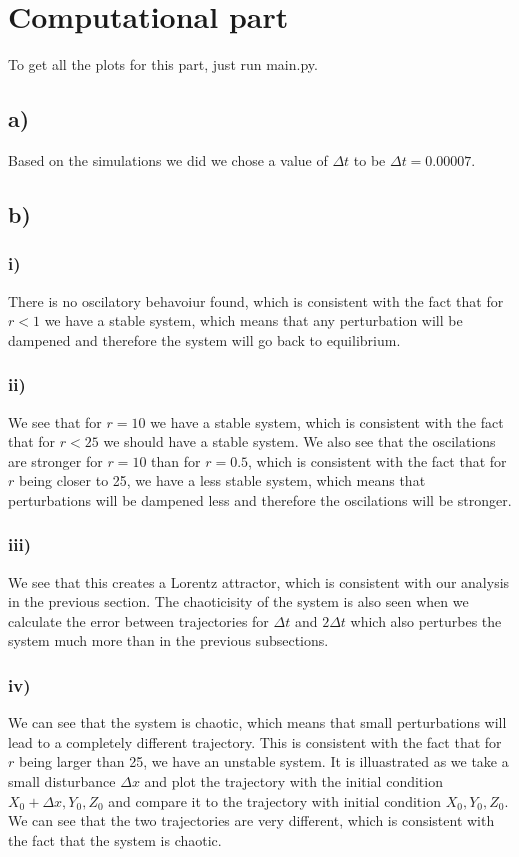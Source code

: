 \documentclass{article}
\begin{document}
\section{Computational part}

To get all the plots for this part, just run main.py.

\subsection*{a)}

Based on the simulations we did we chose a value of $\Delta t$ to be $\Delta t = 0.00007$.

\subsection*{b)}
\subsubsection*{i)}
There is no oscilatory behavoiur found, which is consistent with the fact that for $r<1$ we have a stable system, which means that any perturbation will be dampened and therefore the system will go back to equilibrium.
\subsubsection*{ii)}
We see that for $r = 10$ we have a stable system, which is consistent with the fact that for $r<25$ we should have a stable system. We also see that the oscilations are stronger for $r = 10$ than for $r = 0.5$, which is consistent with the fact that for $r$ being closer to 25, we have a less stable system, which means that perturbations will be dampened less and therefore the oscilations will be stronger.
\subsubsection*{iii)}
We see that this creates a Lorentz attractor, which is consistent with our analysis in the previous section. The chaoticisity of the system is also seen when we calculate the error between trajectories for $\Delta t$ and $2\Delta t$ which also perturbes the system much more than in the previous subsections.
\subsubsection*{iv)}
We can see that the system is chaotic, which means that small perturbations will lead to a completely different trajectory. This is consistent with the fact that for $r$ being larger than 25, we have an unstable system. It is illuastrated as we take a small disturbance $\Delta x$ and plot the trajectory with the initial condition $X_0 + \Delta x, Y_0, Z_0$ and compare it to the trajectory with initial condition $X_0, Y_0, Z_0$. We can see that the two trajectories are very different, which is consistent with the fact that the system is chaotic.
\end{document}
